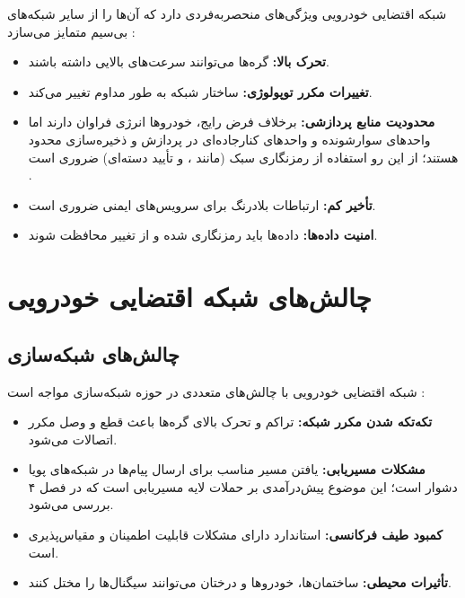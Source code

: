 \documentclass[12pt,a4paper]{article}
\begin{document}
شبکه اقتضایی خودرویی ویژگی‌های منحصربه‌فردی دارد که آن‌ها را از سایر شبکه‌های بی‌سیم متمایز می‌سازد \cite{hozouriOverviewVANETVehicular2023}:

\begin{itemize}
  \item \textbf{تحرک بالا:} گره‌ها می‌توانند سرعت‌های بالایی داشته باشند.
  \item \textbf{تغییرات مکرر توپولوژی:} ساختار شبکه به طور مداوم تغییر می‌کند.
  \item \textbf{محدودیت منابع پردازشی:} برخلاف فرض رایج، خودروها انرژی فراوان دارند اما واحدهای سوارشونده و واحدهای کنارجاده‌ای در پردازش و ذخیره‌سازی محدود هستند؛ از این رو استفاده از رمزنگاری سبک (مانند ،  و تأیید دسته‌ای) ضروری است \cite{farsimadanReviewSecurityChallenges2025}.
  \item \textbf{تأخیر کم:} ارتباطات بلادرنگ برای سرویس‌های ایمنی ضروری است.
  \item \textbf{امنیت داده‌ها:} داده‌ها باید رمزنگاری شده و از تغییر محافظت شوند.
\end{itemize}

\section{چالش‌های شبکه اقتضایی خودرویی}

\subsection{چالش‌های شبکه‌سازی}

شبکه اقتضایی خودرویی با چالش‌های متعددی در حوزه شبکه‌سازی مواجه است \cite{hozouriOverviewVANETVehicular2023}:

\begin{itemize}
  \item \textbf{تکه‌تکه شدن مکرر شبکه:} تراکم و تحرک بالای گره‌ها باعث قطع و وصل مکرر اتصالات می‌شود.
  \item \textbf{مشکلات مسیریابی:} یافتن مسیر مناسب برای ارسال پیام‌ها در شبکه‌های پویا دشوار است؛ این موضوع پیش‌درآمدی بر حملات لایه مسیریابی است که در فصل ۴ بررسی می‌شود.
  \item \textbf{کمبود طیف فرکانسی:} استاندارد  دارای مشکلات قابلیت اطمینان و مقیاس‌پذیری است.
  \item \textbf{تأثیرات محیطی:} ساختمان‌ها، خودروها و درختان می‌توانند سیگنال‌ها را مختل کنند.
\end{itemize}
\end{document}
